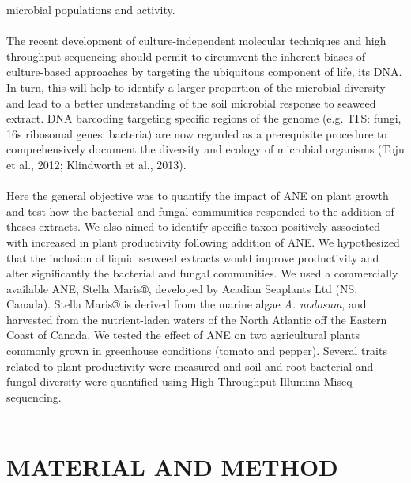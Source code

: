 \documentclass[11pt,]{article}
\begin{document}
microbial populations and activity.\\
\hspace*{0.333em}\\
The recent development of culture-independent molecular techniques and
high throughput sequencing should permit to circumvent the inherent
biases of culture-based approaches by targeting the ubiquitous component
of life, its DNA. In turn, this will help to identify a larger
proportion of the microbial diversity and lead to a better understanding
of the soil microbial response to seaweed extract. DNA barcoding
targeting specific regions of the genome (e.g.~ITS: fungi, 16s ribosomal
genes: bacteria) are now regarded as a prerequisite procedure to
comprehensively document the diversity and ecology of microbial
organisms (Toju et al., 2012; Klindworth et al., 2013).\\
\hspace*{0.333em}\\
Here the general objective was to quantify the impact of ANE on plant
growth and test how the bacterial and fungal communities responded to
the addition of theses extracts. We also aimed to identify specific
taxon positively associated with increased in plant productivity
following addition of ANE. We hypothesized that the inclusion of liquid
seaweed extracts would improve productivity and alter significantly the
bacterial and fungal communities. We used a commercially available ANE,
Stella Maris®, developed by Acadian Seaplants Ltd (NS, Canada). Stella
Maris® is derived from the marine algae \emph{A. nodosum}, and harvested
from the nutrient-laden waters of the North Atlantic off the Eastern
Coast of Canada. We tested the effect of ANE on two agricultural plants
commonly grown in greenhouse conditions (tomato and pepper). Several
traits related to plant productivity were measured and soil and root
bacterial and fungal diversity were quantified using High Throughput
Illumina Miseq sequencing.\\
\hspace*{0.333em}\\
\newpage  

\section{MATERIAL AND METHOD}\label{material-and-method}
\end{document}
